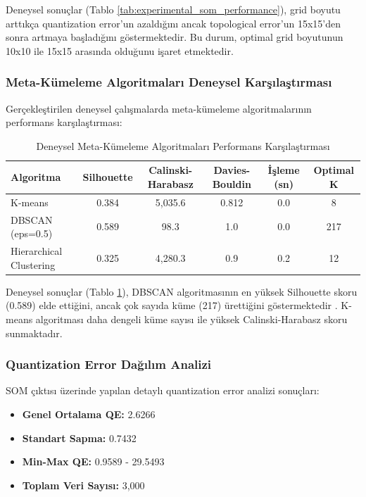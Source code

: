 Deneysel sonuçlar (Tablo \ref{tab:experimental_som_performance}), grid boyutu arttıkça quantization error'un azaldığını ancak topological error'un 15x15'den sonra artmaya başladığını göstermektedir. Bu durum, optimal grid boyutunun 10x10 ile 15x15 arasında olduğunu işaret etmektedir.

\subsubsection{Meta-Kümeleme Algoritmaları Deneysel Karşılaştırması}

Gerçekleştirilen deneysel çalışmalarda meta-kümeleme algoritmalarının performans karşılaştırması:

\begin{table}[!ht]
\centering
\caption{Deneysel Meta-Kümeleme Algoritmaları Performans Karşılaştırması}
\label{tab:experimental_clustering_comparison}
\setlength{\tabcolsep}{4pt} %
\renewcommand{\arraystretch}{0.9} %
\small %
\begin{tabular}{|l|c|c|c|c|c|}
\hline
\textbf{Algoritma} & \textbf{Silhouette} & \textbf{Calinski-Harabasz} & \textbf{Davies-Bouldin} & \textbf{İşleme (sn)} & \textbf{Optimal K} \\
\hline
K-means & 0.384 & 5,035.6 & 0.812 & 0.0 & 8 \\
\hline
DBSCAN (eps=0.5) & 0.589 & 98.3 & 1.0 & 0.0 & 217 \\
\hline
Hierarchical Clustering & 0.325 & 4,280.3 & 0.9 & 0.2 & 12 \\
\hline
\end{tabular}
\end{table}


Deneysel sonuçlar (Tablo \ref{tab:experimental_clustering_comparison}), DBSCAN algoritmasının en yüksek Silhouette skoru (0.589) elde ettiğini, ancak çok sayıda küme (217) ürettiğini göstermektedir \cite{ester1996density}. K-means algoritması daha dengeli küme sayısı ile yüksek Calinski-Harabasz skoru sunmaktadır.

\newpage

\subsubsection{Quantization Error Dağılım Analizi}

SOM çıktısı üzerinde yapılan detaylı quantization error analizi sonuçları:

\begin{itemize}
    \item \textbf{Genel Ortalama QE:} 2.6266
    \item \textbf{Standart Sapma:} 0.7432
    \item \textbf{Min-Max QE:} 0.9589 - 29.5493
    \item \textbf{Toplam Veri Sayısı:} 3,000
\end{itemize}

